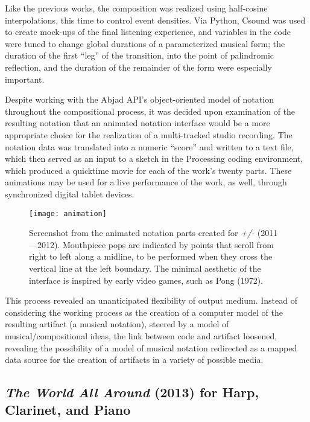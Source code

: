 Like the previous works, the composition was realized using half-cosine interpolations, this time to control event densities. Via Python, Csound was used to create mock-ups of the final listening experience, and variables in the code were tuned to change global durations of a parameterized musical form; the duration of the first ``leg'' of the transition, into the point of palindromic reflection, and the duration of the remainder of the form were especially important. 

Despite working with the Abjad API's object-oriented model of notation throughout the compositional process, it was decided upon examination of the resulting notation that an animated notation interface would be a more appropriate choice for the realization of a multi-tracked studio recording. The notation data was translated into a numeric ``score'' and written to a text file, which then served as an input to a sketch in the Processing coding environment, which produced a quicktime movie for each of the work's twenty parts. These animations may be used for a live performance of the work, as well, through synchronized digital tablet devices.

\begin{figure}[H] 
\texttt{[image: animation]}
\caption{Screenshot from the animated notation parts created for \emph{+/-} (2011---2012). Mouthpiece pops are indicated by points that scroll from right to left along a midline, to be performed when they cross the vertical line at the left boundary. The minimal aesthetic of the interface is inspired by early video games, such as Pong (1972). } 
\end{figure}

This process revealed an unanticipated flexibility of output medium. Instead of considering the working process as the creation of a computer model of the resulting artifact (a musical notation), steered by a model of musical/compositional ideas, the link between code and artifact loosened, revealing the possibility of a model of musical notation redirected as a mapped data source for the creation of artifacts in a variety of possible media.

\subsection{\emph{The World All Around} (2013) for Harp, Clarinet, and Piano}

